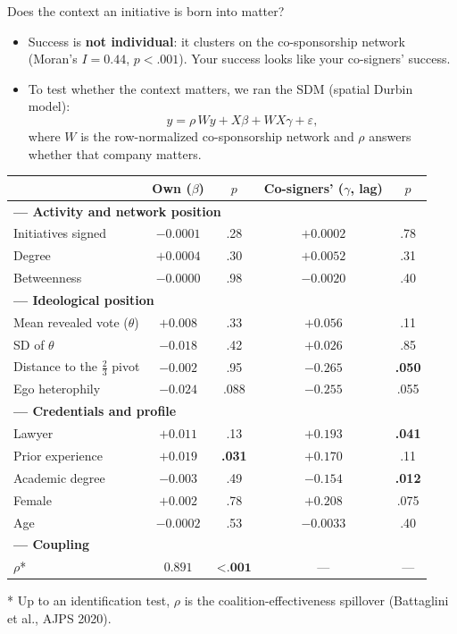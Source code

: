 \documentclass[aspectratio=169,11pt]{beamer}
\newcommand{\emphr}[1]{{\color{ndreddark}\textbf{#1}}}
\newcommand{\nota}[1]{{\footnotesize\color{ndgray} #1}}
\begin{document}
\begin{frame}{Does the context an initiative is born into matter?}
\begin{itemize}
  \item Success is \emphr{not individual}: it clusters on the co-sponsorship network (Moran's $I = 0.44$, $p < .001$). Your success looks like your co-signers' success.
  \vspace{0.3cm}
  \item To test whether the context matters, we ran the SDM (spatial Durbin model):
  $$y = \rho\, W y + X\beta + W X \gamma + \varepsilon,$$
  where $W$ is the row-normalized co-sponsorship network and $\rho$ answers whether that company matters.
\end{itemize}
\end{frame}

\begin{frame}
\begin{center}\footnotesize\setlength{\tabcolsep}{4pt}\renewcommand{\arraystretch}{1.0}
\begin{tabular}{lcccc}
\toprule
 & Own ($\beta$) & $p$ & Co-signers' ($\gamma$, lag) & $p$ \\
\midrule
\multicolumn{5}{l}{\emphr{--- Activity and network position}}\\
Initiatives signed & $-0.0001$ & .28 & $+0.0002$ & .78 \\
Degree & $+0.0004$ & .30 & $+0.0052$ & .31 \\
Betweenness & $-0.0000$ & .98 & $-0.0020$ & .40 \\
\multicolumn{5}{l}{\emphr{--- Ideological position}}\\
Mean revealed vote ($\theta$) & $+0.008$ & .33 & $+0.056$ & .11 \\
SD of $\theta$ & $-0.018$ & .42 & $+0.026$ & .85 \\
Distance to the $\tfrac{2}{3}$ pivot & $-0.002$ & .95 & $-0.265$ & \textbf{.050} \\
Ego heterophily & $-0.024$ & .088 & $-0.255$ & .055 \\
\multicolumn{5}{l}{\emphr{--- Credentials and profile}}\\
Lawyer & $+0.011$ & .13 & $+0.193$ & \textbf{.041} \\
Prior experience & $+0.019$ & \textbf{.031} & $+0.170$ & .11 \\
Academic degree & $-0.003$ & .49 & $-0.154$ & \textbf{.012} \\
Female & $+0.002$ & .78 & $+0.208$ & .075 \\
Age & $-0.0002$ & .53 & $-0.0033$ & .40 \\
\multicolumn{5}{l}{\emphr{--- Coupling}}\\
$\rho$* & $0.891$ & $\textbf{<.001}$ & — & — \\
\bottomrule
\end{tabular}
\end{center}
\nota{* Up to an identification test, $\rho$ is the coalition-effectiveness spillover (Battaglini et al., AJPS 2020).}
\end{frame}
\end{document}

